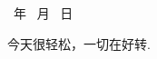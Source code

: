 \documentclass{ctexart}
\begin{document}
{\renewcommand{\today}{\number\year\ 年 \number\month\ 月 \number\day\ 日}\today\vspace*{1.5em}}

今天很轻松，一切在好转.

\footnotetext{\flushright{\xxivtime,\ \today}}
\end{document}

